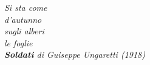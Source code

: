 \begin{flushright}  
\null {}
\emph{Si sta come \\d'autunno \\sugli alberi \\le foglie \\ \textbf{Soldati} di Guiseppe Ungaretti (1918)} 
\end{flushright}